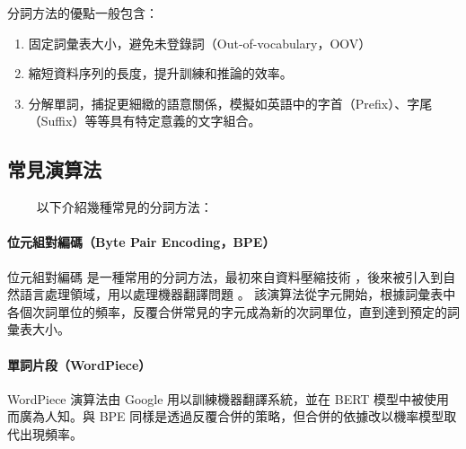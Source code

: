 分詞方法的優點一般包含：

\begin{enumerate}
    \item 固定詞彙表大小，避免未登錄詞（Out-of-vocabulary，OOV）
    \item 縮短資料序列的長度，提升訓練和推論的效率。
    \item 分解單詞，捕捉更細緻的語意關係，模擬如英語中的字首（Prefix）、字尾（Suffix）等等具有特定意義的文字組合。
\end{enumerate}

\subsection{常見演算法}

　　
以下介紹幾種常見的分詞方法：

\paragraph{位元組對編碼（Byte Pair Encoding，BPE）}

位元組對編碼 \cite{10.5555/177910.177914, sennrich_neural_2016} 是一種常用的分詞方法，最初來自資料壓縮技術 \cite{10.5555/177910.177914}，後來被引入到自然語言處理領域，用以處理機器翻譯問題 \cite{sennrich_neural_2016} 。
該演算法從字元開始，根據詞彙表中各個次詞單位的頻率，反覆合併常見的字元成為新的次詞單位，直到達到預定的詞彙表大小。





% 
\paragraph{單詞片段（WordPiece）}

WordPiece \cite{wu2016google} 演算法由 Google 用以訓練機器翻譯系統，並在 BERT \cite{devlin_bert_2019} 模型中被使用而廣為人知。與 BPE 同樣是透過反覆合併的策略，但合併的依據改以機率模型取代出現頻率。


